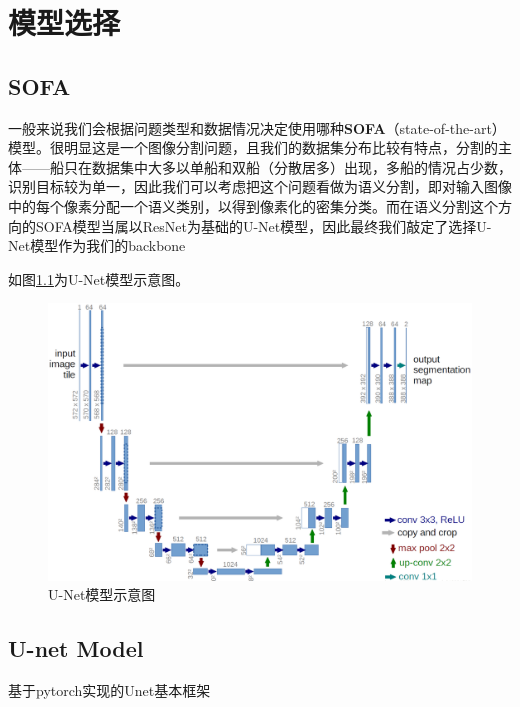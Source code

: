 
\chapter{模型选择}\label{ux6a21ux578bux9009ux62e9}

\section{SOFA}\label{sofa}

一般来说我们会根据问题类型和数据情况决定使用哪种\textbf{SOFA}（state-of-the-art）模型。很明显这是一个图像分割问题，且我们的数据集分布比较有特点，分割的主体------船只在数据集中大多以单船和双船（分散居多）出现，多船的情况占少数，识别目标较为单一，因此我们可以考虑把这个问题看做为语义分割，即对输入图像中的每个像素分配一个语义类别，以得到像素化的密集分类。而在语义分割这个方向的SOFA模型当属以ResNet为基础的U-Net模型，因此最终我们敲定了选择U-Net模型作为我们的backbone

如图\ref{fig::theory1}为U-Net模型示意图。

\begin{figure}[htbp]
\centering
\includegraphics[width=0.8\linewidth]{body/theory_pic/Unet}
\caption{U-Net模型示意图}
\label{fig::theory1}
\end{figure}

\section{U-net Model}\label{u-net-model}

基于pytorch实现的Unet基本框架

